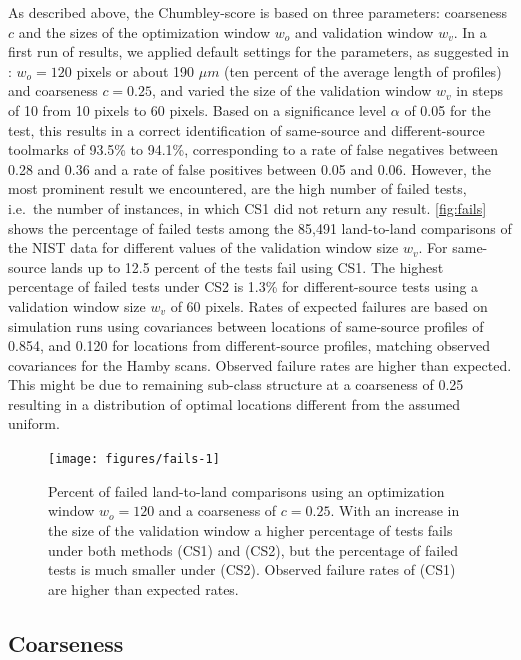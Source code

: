 \documentclass[12pt]{article}
\begin{document}
As described above, the Chumbley-score is based on three parameters:
coarseness \(c\) and the sizes of the optimization window \(w_o\) and
validation window \(w_v\). In a first run of results, we applied default
settings for the parameters, as suggested in \citet{hadler}:
\(w_o = 120\) pixels or about 190 \(\mu m\) (ten percent of the average
length of profiles) and coarseness \(c = 0.25\), and varied the size of
the validation window \(w_v\) in steps of 10 from 10 pixels to 60
pixels. Based on a significance level \(\alpha\) of 0.05 for the test,
this results in a correct identification of same-source and
different-source toolmarks of 93.5\% to 94.1\%, corresponding to a rate
of false negatives between 0.28 and 0.36 and a rate of false positives
between 0.05 and 0.06. However, the most prominent result we
encountered, are the high number of failed tests, i.e.~the number of
instances, in which CS1 did not return any result. \autoref{fig:fails}
shows the percentage of failed tests among the 85,491 land-to-land
comparisons of the NIST data for different values of the validation
window size \(w_v\). For same-source lands up to 12.5 percent of the
tests fail using CS1. The highest percentage of failed tests under CS2
is 1.3\% for different-source tests using a validation window size
\(w_v\) of 60 pixels. Rates of expected failures are based on simulation
runs using covariances between locations of same-source profiles of
0.854, and 0.120 for locations from different-source profiles, matching
observed covariances for the Hamby scans. Observed failure rates are
higher than expected. This might be due to remaining sub-class structure
at a coarseness of 0.25 resulting in a distribution of optimal locations
different from the assumed uniform.

\begin{figure}

{\centering \texttt{[image: figures/fails-1]} 

}

\caption{Percent of failed land-to-land comparisons using an optimization window $w_o = 120$ and a coarseness of $c = 0.25$. With an increase in the size of the validation window  a higher percentage of tests fails under both methods (CS1) and (CS2), but the percentage of failed tests is much smaller under (CS2). Observed failure rates of (CS1) are higher than expected rates.}\label{fig:fails}
\end{figure}

\hypertarget{coarseness}{%
\subsection{Coarseness}\label{coarseness}}
\end{document}
